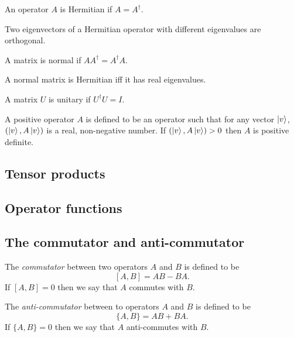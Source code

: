 \documentclass{article}
\begin{document}
\begin{definition}[Hermitian]
  An operator $A$ is Hermitian if $A=A^\dagger$.
\end{definition}

\begin{theorem}
  Two eigenvectors of a Hermitian operator with different eigenvalues are orthogonal.
\end{theorem}

\begin{definition}
  A matrix is normal if $AA^\dagger=A^\dagger A$.
\end{definition}

\begin{theorem}
  A normal matrix is Hermitian iff it has real eigenvalues.
\end{theorem}

\begin{definition}[Unitary]
  A matrix $U$ is unitary if $U^\dagger U=I$.
\end{definition}

\begin{definition}
  A positive operator $A$ is defined to be an operator
  such that for any vector $\ket{v}$, $(\ket{v},A\ket{v})$
  is a real, non-negative number. If $(\ket{v}, A\ket{v})>0$
  then $A$ is positive definite.
\end{definition}

\subsection{Tensor products}
\subsection{Operator functions}
\subsection{The commutator and anti-commutator}
\begin{definition}[Commutator]
  The \textit{commutator} between two operators $A$ and $B$ is defined to be
  \[[A,B]=AB-BA.\]
  If $[A,B]=0$ then we say that $A$ commutes with $B$.
\end{definition}
\begin{definition}
  The \textit{anti-commutator} between to operators $A$ and $B$ is defined to be
  \[\{A,B\}=AB+BA.\]
  If $\{A,B\}=0$ then we say that $A$ anti-commutes with $B$.
\end{definition}
\end{document}
